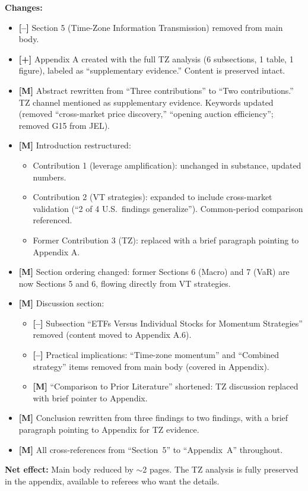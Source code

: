 \documentclass[12pt,a4paper]{article}
\newcommand{\ADD}[1]{\textcolor{addgreen}{\textbf{[+]} #1}}
\newcommand{\DEL}[1]{\textcolor{delred}{\textbf{[--]} #1}}
\newcommand{\MOD}[1]{\textcolor{modblue}{\textbf{[M]} #1}}
\begin{document}
\textbf{Changes:}
\begin{itemize}
\item \DEL{Section 5 (Time-Zone Information Transmission)} removed from main body.
\item \ADD{Appendix A} created with the full TZ analysis (6 subsections, 1 table, 1 figure), labeled as ``supplementary evidence.'' Content is preserved intact.
\item \MOD{Abstract} rewritten from ``Three contributions'' to ``Two contributions.'' TZ channel mentioned as supplementary evidence. Keywords updated (removed ``cross-market price discovery,'' ``opening auction efficiency''; removed G15 from JEL).
\item \MOD{Introduction} restructured:
  \begin{itemize}
  \item Contribution 1 (leverage amplification): unchanged in substance, updated numbers.
  \item Contribution 2 (VT strategies): expanded to include cross-market validation (``2 of 4 U.S.\ findings generalize''). Common-period comparison referenced.
  \item Former Contribution 3 (TZ): replaced with a brief paragraph pointing to Appendix A.
  \end{itemize}
\item \MOD{Section ordering} changed: former Sections 6 (Macro) and 7 (VaR) are now Sections 5 and 6, flowing directly from VT strategies.
\item \MOD{Discussion section}:
  \begin{itemize}
  \item \DEL{Subsection ``ETFs Versus Individual Stocks for Momentum Strategies''} removed (content moved to Appendix A.6).
  \item \DEL{Practical implications: ``Time-zone momentum'' and ``Combined strategy'' items} removed from main body (covered in Appendix).
  \item \MOD{``Comparison to Prior Literature''} shortened: TZ discussion replaced with brief pointer to Appendix.
  \end{itemize}
\item \MOD{Conclusion} rewritten from three findings to two findings, with a brief paragraph pointing to Appendix for TZ evidence.
\item \MOD{All cross-references} from ``Section~5'' to ``Appendix~A'' throughout.
\end{itemize}

\textbf{Net effect:} Main body reduced by $\sim$2 pages. The TZ analysis is fully preserved in the appendix, available to referees who want the details.
\end{document}
